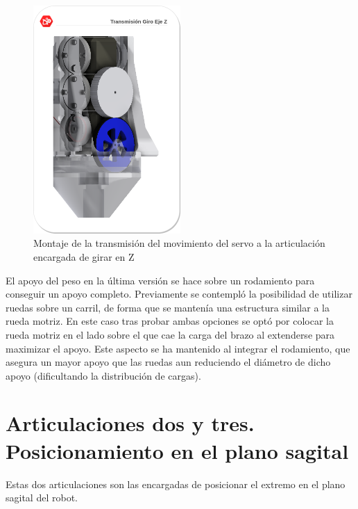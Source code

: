 	\begin{figure}[H]
		\centering
		\includegraphics[width=0.5\textwidth]{figuras/Imagenes_Mecanica/RuedasGiroZ.png}   
		\caption{Montaje de la transmisión del movimiento del servo a la articulación encargada de girar en Z}
		\label{fig:Mecanica:giro_z}
	\end{figure}
	
	El apoyo del peso en la última versión se hace sobre un rodamiento  para conseguir un apoyo completo. Previamente se contempló la posibilidad de utilizar ruedas sobre un carril, de forma que se mantenía una estructura similar a la rueda motriz. En este caso tras probar ambas opciones se optó por colocar la rueda motriz en el lado sobre el que cae la carga del brazo al extenderse para maximizar el apoyo. Este aspecto se ha mantenido al integrar el rodamiento, que asegura un mayor apoyo que las ruedas aun reduciendo el diámetro de dicho apoyo (dificultando la distribución de cargas).
	
	
	
\section{Articulaciones dos y tres. Posicionamiento en el plano sagital} \label{sec:Mecanica:articulacion_dostres}
    Estas dos articulaciones son las encargadas de posicionar el extremo en el plano sagital del robot.
    \\ 
    
